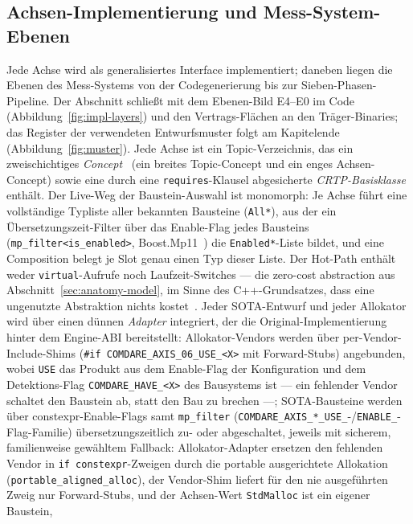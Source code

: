 \begin{nurlang}
\section{Achsen-Implementierung und Mess-System-Ebenen}\label{sec:axes-impl}
Jede Achse wird als generalisiertes Interface implementiert; daneben liegen die Ebenen des Mess-Systems von der
Codegenerierung bis zur Sieben-Phasen-Pipeline. Der Abschnitt schließt mit dem Ebenen-Bild E4--E0 im Code
(Abbildung~\ref{fig:impl-layers}) und den Vertrags-Flächen an den Träger-Binaries; das Register der
verwendeten Entwurfsmuster folgt am Kapitelende (Abbildung~\ref{fig:muster}).
Jede Achse ist ein Topic-Verzeichnis, das ein zweischichtiges \emph{Concept}~\cite{sutton2012concepts} (ein
breites Topic-Concept und ein enges Achsen-Concept) sowie eine durch eine \texttt{requires}-Klausel
abgesicherte \emph{CRTP-Basisklasse} enthält. Der Live-Weg der Baustein-Auswahl ist monomorph: Je Achse
führt eine vollständige Typliste aller bekannten Bausteine (\texttt{All*}), aus der ein
Übersetzungszeit-Filter über das Enable-Flag jedes Bausteins (\texttt{mp\_filter<is\_enabled>},
Boost.Mp11~\cite{dimov_mp11}) die \texttt{Enabled*}-Liste bildet, und eine Composition belegt je Slot genau
einen Typ dieser Liste. Der Hot-Path enthält weder \texttt{virtual}-Aufrufe noch Laufzeit-Switches --- die
zero-cost abstraction aus Abschnitt~\ref{sec:anatomy-model}, im Sinne des C++-Grundsatzes, dass eine
ungenutzte Abstraktion nichts kostet~\cite{stroustrup2012foundations}. Jeder SOTA-Entwurf und jeder
Allokator wird über einen dünnen \emph{Adapter} integriert, der die Original-Implementierung hinter dem
Engine-ABI bereitstellt: Allokator-Vendors werden über per-Vendor-Include-Shims
(\texttt{\#if COMDARE\_AXIS\_06\_USE\_<X>} mit Forward-Stubs) angebunden, wobei \texttt{USE} das Produkt aus
dem Enable-Flag der Konfiguration und dem Detektions-Flag \texttt{COMDARE\_HAVE\_<X>} des Bausystems ist
--- ein fehlender Vendor schaltet den Baustein ab, statt den Bau zu brechen ---; SOTA-Bausteine werden über
constexpr-Enable-Flags samt \texttt{mp\_filter} (\texttt{COMDARE\_AXIS\_*\_USE\_}-/\texttt{ENABLE\_}-Flag-Familie)
übersetzungszeitlich zu- oder abgeschaltet, jeweils mit sicherem, familienweise gewähltem Fallback:
Allokator-Adapter ersetzen den fehlenden Vendor in \texttt{if constexpr}-Zweigen durch die portable
ausgerichtete Allokation (\texttt{portable\_aligned\_alloc}), der Vendor-Shim liefert für den nie
ausgeführten Zweig nur Forward-Stubs, und der Achsen-Wert \texttt{StdMalloc} ist ein eigener Baustein,

\end{nurlang}
